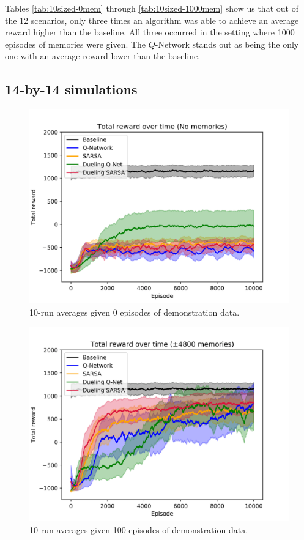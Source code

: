 Tables \ref{tab:10sized-0mem} through \ref{tab:10sized-1000mem} show us that out of the 12 scenarios, only three times an algorithm was able to achieve an average reward higher than the baseline. All three occurred in the setting where 1000 episodes of memories were given. The $Q$-Network stands out as being the only one with an average reward lower than the baseline.




\subsection{14-by-14 simulations}
\begin{figure}[H]
    \centering
    \includegraphics[width=\linewidth]{img/results/14-sized/total_rewards_0m-min.png}
    \caption{10-run averages given 0 episodes of demonstration data.}
    \label{fig:14sized-0mem}
\end{figure}
\begin{figure}[H]
    \centering
    \includegraphics[width=\linewidth]{img/results/14-sized/total_rewards_100m-min.png}
    \caption{10-run averages given 100 episodes of demonstration data.}
    \label{fig:14sized-100mem}
\end{figure}
